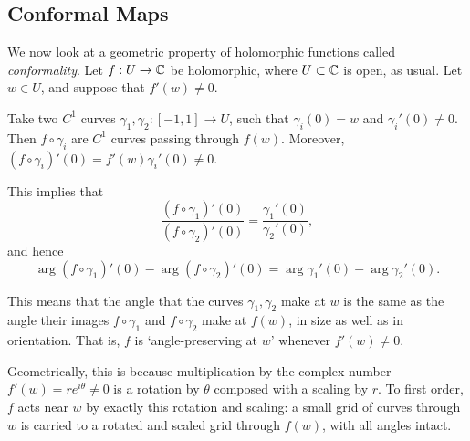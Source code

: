 \documentclass[a4paper]{scrartcl}
\begin{document}
\subsection{Conformal Maps}

We now look at a geometric property of holomorphic functions called \emph{conformality}.
Let $f: U \rightarrow \mathbb{C}$ be holomorphic, where $U \subset \mathbb{C}$ is open, as usual. Let $w \in U$, and suppose that $f'(w) \neq 0$.

Take two $C^1$ curves $\gamma_1, \gamma_2 : [-1, 1] \rightarrow U$, such that $\gamma_i(0) = w$ and $\gamma_i'(0) \neq 0$. Then $f \circ \gamma_i$ are $C^1$ curves passing through $f(w)$. 
Moreover, $(f \circ \gamma_i)'(0) = f'(w) \gamma_i'(0) \neq 0$.

This implies that
$$
\frac{(f \circ \gamma_1)'(0)}{(f \circ \gamma_2)'(0)} = \frac{\gamma_1'(0)}{\gamma_2'(0)},
$$
and hence
$$
\arg(f \circ \gamma_1)'(0) - \arg(f \circ \gamma_2)'(0) = \arg \gamma_1'(0) - \arg \gamma_2'(0).
$$

This means that the angle that the curves $\gamma_1, \gamma_2$ make at $w$ is the same as the angle their images $f \circ \gamma_1$ and $f\circ \gamma_2$ make at $f(w)$, in size as well as in orientation. That is, $f$ is `angle-preserving at $w$' whenever $f'(w) \neq 0$.

Geometrically, this is because multiplication by the complex number $f'(w) = re^{i\theta} \neq 0$ is a rotation by $\theta$ composed with a scaling by $r$. To first order, $f$ acts near $w$ by exactly this rotation and scaling: a small grid of curves through $w$ is carried to a rotated and scaled grid through $f(w)$, with all angles intact.

\begin{center}
\end{center}
\end{document}
